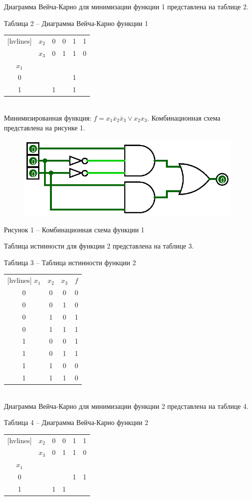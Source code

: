 \documentclass[a4paper,14pt]{extarticle}
\begin{document}
	Диаграмма Вейча-Карно для минимизации функции 1 представлена на таблице 2.
	
	\noindent Таблица 2 -- Диаграмма Вейча-Карно функции 1 \\
	\begin{NiceTabular}{cccccc}[hvlines]
		& $x_2$ & 0 & 0 & 1 & 1 \\
		& $x_3$ & 0 & 1 & 1 & 0 \\
		$x_1$ & & & & & \\
		0 & & & & 1 & \\
		1 & & 1 & & 1 &
	\end{NiceTabular} \\
	
	Минимизированная функция: $f=x_1\overline{x}_2\overline{x}_3\lor x_2x_3$. Комбинационная схема представлена на рисунке 1.
	
	\begin{figure}[h]
		\centering
		\includegraphics[width=0.5\linewidth]{images/s-1-1}
	\end{figure}
	\begin{center}
		Рисунок 1 – Комбинационная схема функции 1
	\end{center}
	
	\pagebreak
	Таблица истинности для функции 2 представлена на таблице 3.
	
	\noindent Таблица 3 -- Таблица истинности функции 2 \\
	\begin{NiceTabular}{cccc}[hvlines]
		$x_1$ & $x_2$ & $x_3$ & $f$ \\
		0 & 0 & 0 & 0 \\
		0 & 0 & 1 & 0 \\
		0 & 1 & 0 & 1 \\
		0 & 1 & 1 & 1 \\
		1 & 0 & 0 & 1 \\
		1 & 0 & 1 & 1 \\
		1 & 1 & 0 & 0 \\
		1 & 1 & 1 & 0
	\end{NiceTabular}\\
	
	Диаграмма Вейча-Карно для минимизации функции 2 представлена на таблице 4.
	
	\noindent Таблица 4 -- Диаграмма Вейча-Карно функции 2 \\
	\begin{NiceTabular}{cccccc}[hvlines]
		& $x_2$ & 0 & 0 & 1 & 1 \\
		& $x_3$ & 0 & 1 & 1 & 0 \\
		$x_1$ & & & & & \\
		0 & & & & 1 & 1 \\
		1 & & 1 & 1 & &
	\end{NiceTabular}\\
	
\end{document}
